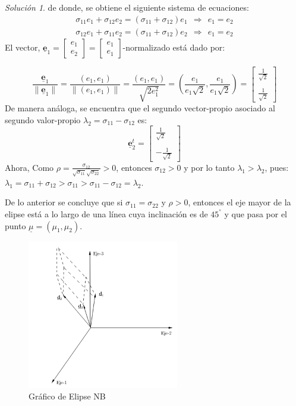 \documentclass[
]{book}
\theoremstyle{definition}
\theoremstyle{definition}
\theoremstyle{definition}
\theoremstyle{definition}
\theoremstyle{remark}
\newtheorem*{solution}{Solución}
\begin{document}
\begin{solution}
de donde, se obtiene el siguiente sistema de ecuaciones:
\begin{align*}
\sigma_{11}e_1+\sigma_{12}e_2=(\sigma_{11}+\sigma_{12})e_1 \ \ \Longrightarrow \ \ e_1=e_2\\
\sigma_{12}e_1+\sigma_{11}e_2=(\sigma_{11}+\sigma_{12})e_2 \ \ \Longrightarrow \ \ e_1=e_2
\end{align*}
El vector, \(\underline{\mathbf{e}}_1= \begin{bmatrix} e_1 \\ e_2 \end{bmatrix} = \begin{bmatrix}  e_1 \\ e_1 \end{bmatrix}\)-normalizado está dado por:

\[
\frac{\underline{\mathbf{e}}_1}{\|\underline{\mathbf{e}}_1\|}=\frac{(e_1,e_1)}{\|(e_1,e_1)\|}=\frac{(e_1,e_1)}{\sqrt{2e_1^2}}=\left(\frac{e_1}{e_1\sqrt{2}} , \frac{e_1}{e_1\sqrt{2}}\right)=  \begin{bmatrix}
\frac{1}{\sqrt{2}} \\ \\ \frac{1}{\sqrt{2}}
\end{bmatrix} 
\]
De manera análoga, se encuentra que el segundo vector-propio asociado al segundo valor-propio \(\lambda_2=\sigma_{11}-\sigma_{12}\) es:
\[
\underline{\mathbf{e}}_2^t=\begin{bmatrix}
\frac{1}{\sqrt{2}} \\ \\ -\frac{1}{\sqrt{2}}
\end{bmatrix} 
\]
Ahora, Como \(\rho=\frac{\sigma_{12}}{\sqrt{\sigma_{11}}\sqrt{\sigma_{22}}}>0\), entonces \(\sigma_{12}>0\) y por lo tanto \(\lambda_1>\lambda_2\), pues: ~~\(\lambda_1=\sigma_{11}+\sigma_{12}> \sigma_{11}>\sigma_{11}-\sigma_{12}=\lambda_2\).

De lo anterior se concluye que si \(\sigma_{11}=\sigma_{22}\) y \(\rho >0\), entonces el eje mayor de la elipse está a lo largo de una línea cuya inclinación es de \(45^{°}\) y que pasa por el punto \(\underline{\mu}=(\mu_1,\mu_2)\).
\end{solution}

\begin{figure}

{\centering \includegraphics[width=0.5\linewidth]{imagenes/graf6} 

}

\caption{Gráfico de Elipse NB}\label{fig:elipse-NB}
\end{figure}
\end{document}
